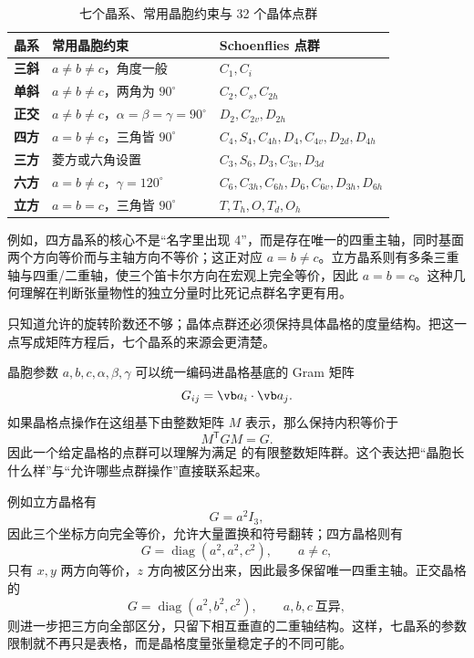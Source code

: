 \begin{table}[htbp]
\centering
\caption{七个晶系、常用晶胞约束与 32 个晶体点群}
\label{tab:32-crystal-point-groups}
\small
\begin{tabularx}{\textwidth}{>{\bfseries}l l X}
\toprule
晶系 & 常用晶胞约束 & Schoenflies 点群 \\
\midrule
三斜 & $a\neq b\neq c$，角度一般 & $C_1,C_i$ \\
单斜 & $a\neq b\neq c$，两角为 $90^\circ$ & $C_2,C_s,C_{2h}$ \\
正交 & $a\neq b\neq c$，$\alpha=\beta=\gamma=90^\circ$ & $D_2,C_{2v},D_{2h}$ \\
四方 & $a=b\neq c$，三角皆 $90^\circ$ & $C_4,S_4,C_{4h},D_4,C_{4v},D_{2d},D_{4h}$ \\
三方 & 菱方或六角设置 & $C_3,S_6,D_3,C_{3v},D_{3d}$ \\
六方 & $a=b\neq c$，$\gamma=120^\circ$ & $C_6,C_{3h},C_{6h},D_6,C_{6v},D_{3h},D_{6h}$ \\
立方 & $a=b=c$，三角皆 $90^\circ$ & $T,T_h,O,T_d,O_h$ \\
\bottomrule
\end{tabularx}
\end{table}

例如，四方晶系的核心不是“名字里出现 4”，而是存在唯一的四重主轴，同时基面两个方向等价而与主轴方向不等价；这正对应 $a=b\neq c$。立方晶系则有多条三重轴与四重/二重轴，使三个笛卡尔方向在宏观上完全等价，因此 $a=b=c$。这种几何理解在判断张量物性的独立分量时比死记点群名字更有用。

只知道允许的旋转阶数还不够；晶体点群还必须保持具体晶格的度量结构。把这一点写成矩阵方程后，七个晶系的来源会更清楚。

晶胞参数 $a,b,c,\alpha,\beta,\gamma$ 可以统一编码进晶格基底的 Gram 矩阵
\[
G_{ij}=\vb a_i\cdot\vb a_j.
\]
如果晶格点操作在这组基下由整数矩阵 $M$ 表示，那么保持内积等价于
\[
M^{\mathsf T}GM=G.
\label{eq:lattice-metric-invariance}
\]
因此一个给定晶格的点群可以理解为满足  的有限整数矩阵群。这个表达把“晶胞长什么样”与“允许哪些点群操作”直接联系起来。

例如立方晶格有
\[
G=a^2 I_3,
\]
因此三个坐标方向完全等价，允许大量置换和符号翻转；四方晶格则有
\[
G=\operatorname{diag}(a^2,a^2,c^2),
\qquad a\neq c,
\]
只有 $x,y$ 两方向等价，$z$ 方向被区分出来，因此最多保留唯一四重主轴。正交晶格的
\[
G=\operatorname{diag}(a^2,b^2,c^2),
\qquad a,b,c\ \text{互异},
\]
则进一步把三方向全部区分，只留下相互垂直的二重轴结构。这样，七晶系的参数限制就不再只是表格，而是晶格度量张量稳定子的不同可能。

